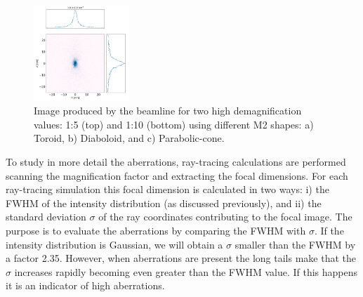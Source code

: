 \documentclass[a4paper, 11pt]{article}
\begin{document}
\begin{figure}[h]
\includegraphics[width=0.32\textwidth]{figures/M0p1_parabolic-cone.png}
\caption{\label{fig:demagnification}
Image produced by the beamline for two high demagnification values: 1:5 (top) and 1:10 (bottom) using different M2 shapes: a) Toroid, b) Diaboloid, and c) Parabolic-cone.}
\end{figure}


To study in more detail the aberrations, ray-tracing calculations are performed scanning the magnification factor and extracting the focal dimensions. For each ray-tracing simulation this focal dimension is calculated in two ways: i) the FWHM of the intensity distribution (as discussed previously), and ii) the standard deviation $\sigma$ of the ray coordinates contributing to the focal image. The purpose is to evaluate the aberrations by comparing the FWHM with $\sigma$. If the intensity distribution is Gaussian, we will obtain a $\sigma$ smaller than the FWHM by a factor 2.35. However, when aberrations are present the long tails make that the $\sigma$ increases rapidly becoming even greater than the FWHM value. If this happens it is an indicator of high aberrations.  
\end{document}
